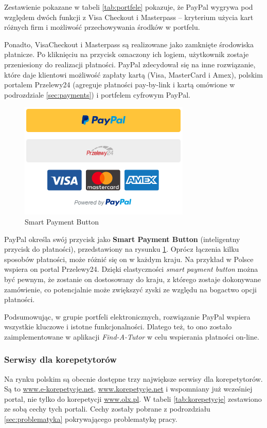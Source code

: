 \documentclass[12pt]{article}
\numberwithin{figure}{section}
\begin{document}
\begin{sloppypar}
Zestawienie pokazane w tabeli \ref{tab:portfele} pokazuje, że PayPal wygrywa pod względem dwóch funkcji z Visa Checkout i Masterpass -- kryterium użycia kart różnych firm i możliwość przechowywania środków w portfelu.

Ponadto, VisaCheckout i Masterpass są realizowane jako zamknięte środowiska płatnicze. Po kliknięciu na przycisk oznaczony ich logiem, użytkownik zostaje przeniesiony do realizacji płatności. PayPal zdecydował się na inne rozwiązanie, które daje klientowi możliwość zapłaty kartą (Visa, MasterCard i Amex), polskim portalem Przelewy24 (agreguje płatności pay-by-link i kartą omówione w podrozdziale \ref{sec:payments}) i portfelem cyfrowym PayPal. 

\begin{figure}[H] 
 	\centering
	\includegraphics[scale=1.0]{images/chapter_2/paypal-button.png}
	\caption{Smart Payment Button}
	\label{fig:paypal-button}
\end{figure}

PayPal określa swój przycisk jako \textbf{Smart Payment Button} (inteligentny przycisk do płatności), przedstawiony na rysunku \ref{fig:paypal-button}. Oprócz łączenia kilku sposobów płatności, może różnić się on w każdym kraju. Na przykład w Polsce wspiera on portal Przelewy24. Dzięki elastyczności \textit{smart payment button} można być pewnym, że zostanie on dostosowany do kraju, z którego zostaje dokonywane zamówienie, co potencjalnie może zwiększyć zyski ze względu na bogactwo opcji płatności. 

Podsumowując, w grupie portfeli elektronicznych, rozwiązanie PayPal wspiera wszystkie kluczowe i istotne funkcjonalności. Dlatego też, to ono zostało zaimplementowane w aplikacji \textit{Find-A-Tutor} w celu wspierania płatności on-line.

\subsubsection{Serwisy dla korepetytorów}
Na rynku polskim są obecnie dostępne trzy największe serwisy dla korepetytorów. Są to \url{www.e-korepetycje.net}, \url{www.korepetycje.net} i wspomniany już wcześniej portal, nie tylko do korepetycji \url{www.olx.pl}. W tabeli \ref{tab:korepetycje} zestawiono ze sobą cechy tych portali. Cechy zostały pobrane z podrozdziału \ref{sec:problematyka} pokrywającego problematykę pracy.


\end{sloppypar}
\end{document}
